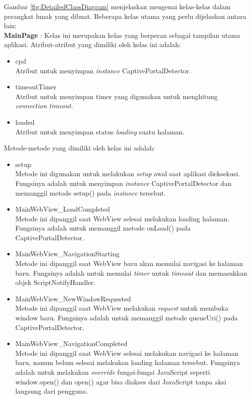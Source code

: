 \documentclass[a4paper,twoside]{article}
\begin{document}
\begin{enumerate}
\begin{itemize}
{                Gambar \ref{fig:DetailedClassDiagram} menjelaskan mengenai kelas-kelas dalam perangkat lunak yang dibuat. Beberapa kelas utama yang perlu dijelaskan antara lain:\\
                \textbf{MainPage} : Kelas ini merupakan kelas yang berperan sebagai tampilan utama aplikasi. Atribut-atribut yang dimiliki oleh kelas ini adalah:
                \begin{itemize}
                    \item{cpd\\Atribut untuk menyimpan \textit{instance} CaptivePortalDetector.}
                    \item{timeoutTimer\\Atribut untuk menyimpan timer yang digunakan untuk menghitung \textit{connection timeout}.}
                    \item{loaded\\Atribut untuk menyimpan status \textit{loading} suatu halaman.}
                \end{itemize}
                Metode-metode yang dimiliki oleh kelas ini adalah:
                \begin{itemize}
                    \item{setup\\Metode ini digunakan untuk melakukan \textit{setup} awal saat aplikasi dieksekusi. Fungsinya adalah untuk menyimpan \textit{instance} CaptivePortalDetector dan memanggil metode setup() pada \textit{instance} tersebut.}
                    \item{MainWebView\_LoadCompleted\\Metode ini dipanggil saat WebView selesai melakukan loading halaman. Fungsinya adalah untuk memanggil metode onLoad() pada CaptivePortalDetector.}
                    \item{MainWebView\_NavigationStarting\\Metode ini dipanggil saat WebView baru akan memulai navigasi ke halaman baru. Fungsinya adalah untuk memulai \textit{timer} untuk \textit{timeout} dan memasukkan objek ScriptNotifyHandler.}
                    \item{MainWebView\_NewWindowRequested\\Metode ini dipanggil saat WebView melakukan \textit{request} untuk membuka window baru. Fungsinya adalah untuk memanggil metode queueUri() pada CaptivePortalDetector.}
                    \item{MainWebView\_NavigationCompleted\\Metode ini dipanggil saat WebView selesai melakukan navigasi ke halaman baru, namun belum selesai melakukan loading halaman tersebut. Fungsinya adalah untuk melakukan \textit{override} fungsi-fungsi JavaScript seperti window.open() dan open() agar bisa diakses dari JavaScript tanpa aksi langsung dari pengguna.}
                \end{itemize}
                
}
\end{itemize}
\end{enumerate}
\end{document}
